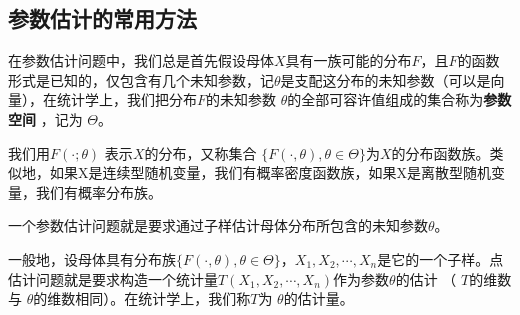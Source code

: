 \subsection{参数估计的常用方法}

	在参数估计问题中，我们总是首先假设母体$ X $具有一族可能的分布$ F $，且$ F $的函数形式是已知的，仅包含有几个未知参数，记$ \theta $是支配这分布的未知参数（可以是向量），在统计学上，我们把分布$ F $的未知参数
	$ \theta $的全部可容许值组成的集合称为{\bf 参数空间 }，记为 $ \Theta $。
	
	我们用$ F(\cdot ; \theta)  $ 表示$ X $的分布，又称集合  $ \{F(\cdot , \theta), \theta \in \Theta\} $为$ X $的分布函数族。类似地，如果X是连续型随机变量，我们有概率密度函数族，如果X是离散型随机变量，我们有概率分布族。
	
	一个参数估计问题就是要求通过子样估计母体分布所包含的未知参数$ \theta $。
	
	一般地，设母体具有分布族$ \{F(\cdot , \theta), \theta \in \Theta\} $，$ X_1, X_2 , \cdots ,X_n $是它的一个子样。点估计问题就是要求构造一个统计量$ T(X_1, X_2 , \cdots ,X_n) $作为参数$ \theta $的估计
	（  $ T $的维数与  $ \theta $的维数相同）。在统计学上，我们称$ T $为 $ \theta $的估计量。
	
